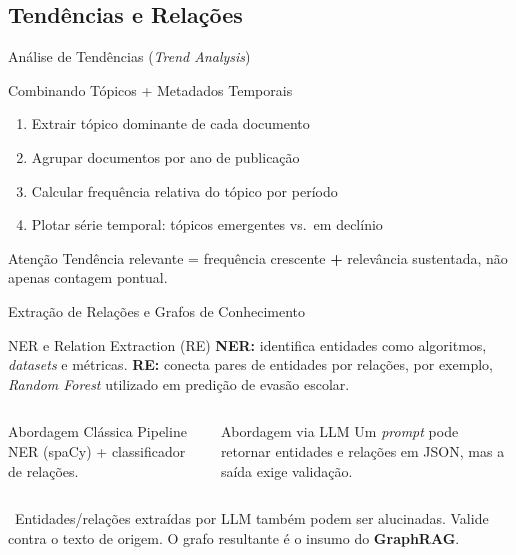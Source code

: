 \documentclass[aspectratio=169]{beamer}
\begin{document}
\subsection{Tendências e Relações}

\begin{frame}{Análise de Tendências (\textit{Trend Analysis})}
    \begin{block}{Combinando Tópicos + Metadados Temporais}
        \begin{enumerate}\footnotesize
            \item Extrair tópico dominante de cada documento
            \item Agrupar documentos por ano de publicação
            \item Calcular frequência relativa do tópico por período
            \item Plotar série temporal: tópicos emergentes vs.\ em declínio
        \end{enumerate}
    \end{block}
    \pause
    \begin{alertblock}{Atenção}
        \footnotesize Tendência relevante = frequência crescente \textbf{+} relevância sustentada, não apenas contagem pontual.
    \end{alertblock}
\end{frame}

\begin{frame}[shrink=5]{Extração de Relações e Grafos de Conhecimento}
    \begin{block}{NER e Relation Extraction (RE)}
        \footnotesize \textbf{NER:} identifica entidades como algoritmos, \textit{datasets} e métricas. \textbf{RE:} conecta pares de entidades por relações, por exemplo, \textit{Random Forest} utilizado em predição de evasão escolar.
    \end{block}
    \pause
    \begin{columns}
        \begin{block}{Abordagem Clássica}
            \footnotesize Pipeline NER (spaCy) + classificador de relações.
        \end{block}
        \begin{block}{Abordagem via LLM}
            \footnotesize Um \textit{prompt} pode retornar entidades e relações em JSON, mas a saída exige validação.
        \end{block}
    \end{columns}
    \pause
    \begin{alertblock}{}
        \footnotesize {}\ Entidades/relações extraídas por LLM também podem ser alucinadas. Valide contra o texto de origem. O grafo resultante é o insumo do \textbf{GraphRAG}.
    \end{alertblock}
\end{frame}
\end{document}
